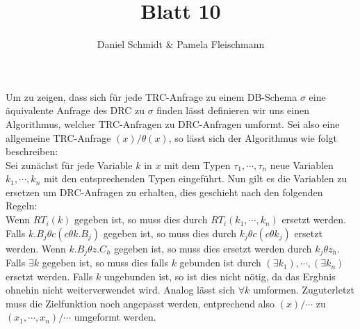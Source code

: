 \documentclass[12pt,a4paper]{amsart}
\begin{document}
\title{Blatt 10}

\author{Daniel Schmidt \& Pamela Fleischmann}

\maketitle

\begin{aufgabe1}
Um zu zeigen, dass sich für jede TRC-Anfrage zu einem DB-Schema $\sigma$ eine äquivalente Anfrage des DRC zu $\sigma$ finden lässt definieren wir uns einen Algorithmus, welcher TRC-Anfragen zu DRC-Anfragen umformt.
Sei also eine allgemeine TRC-Anfrage $(x) / \theta(x)$, so lässt sich der Algorithmus wie folgt beschreiben: \\
Sei zunächst für jede Variable $k$ in $x$ mit dem Typen $\tau_1, \cdots, \tau_n$ neue Variablen $k_1, \cdots, k_n$ mit den entsprechenden Typen eingeführt. Nun gilt es die Variablen zu ersetzen um DRC-Anfragen zu erhalten, dies geschieht nach den folgenden Regeln: \\
Wenn $RT_i(k)$ gegeben ist, so muss dies durch $RT_i(k_1, \cdots, k_n)$ ersetzt werden.
Falls $k.B_j \theta c(c \theta k.B_j)$ gegeben ist, so muss dies durch $k_j \theta c(c \theta k_j)$ ersetzt werden.
Wenn $k.B_j \theta z.C_h$ gegeben ist, so muss dies ersetzt werden durch $k_j \theta z_h$. \\
Falls $\exists k$ gegeben ist, so muss dies falls $k$ gebunden ist durch $(\exists k_1), \cdots, (\exists k_n)$ ersetzt werden. Falls $k$ ungebunden ist, so ist dies nicht nötig, da das Ergbnis ohnehin nicht weiterverwendet wird.
Analog lässt sich $\forall k$ umformen.
Zuguterletzt muss die Zielfunktion noch angepasst werden, entprechend also $(x) / \cdots$ zu $(x_1, \cdots, x_n) / \cdots$ umgeformt werden.
\end{aufgabe1}
\end{document}
